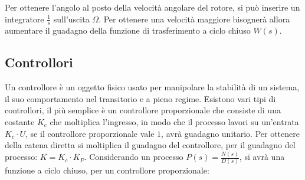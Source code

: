 \documentclass{article}
\numberwithin{equation}{subsection}
\begin{document}
\begin{center}\end{center}
Per ottenere l'angolo al posto della velocità angolare del rotore, si può inserire un integratore $\displaystyle\frac{1}{s}$ sull'uscita $\Omega$. Per ottenere una velocità 
maggiore bisognerà allora aumentare il guadagno della funzione di trasferimento a ciclo chiuso $W(s)$. 

\subsection{Controllori}

Un controllore è un oggetto fisico usato per manipolare la stabilità di un sistema, il suo comportamento nel transitorio e a pieno regime. 
Esistono vari tipi di controllori, il più semplice è un controllore proporzionale che consiste di una costante $K_c$ che moltiplica l'ingresso, in modo 
che il processo lavori su un'entrata $K_c\cdot U$, se il controllore proporzionale vale $1$, avrà guadagno unitario. Per ottenere della catena 
diretta si moltiplica il guadagno del controllore, per il guadagno del processo: $K=K_c\cdot K_P$. Considerando un processo 
$P(s)=\displaystyle\frac{N(s)}{D(s)}$, si avrà una funzione a ciclo chiuso, per un controllore proporzionale: 
\end{document}

